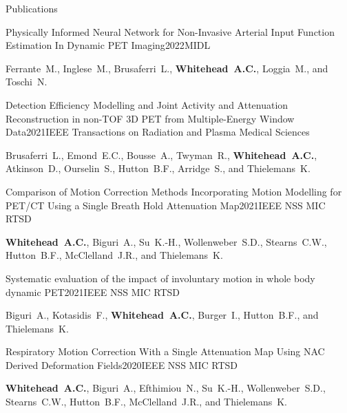 \documentclass{cv}
\begin{document}
\begin{rSection}{Publications}
        \item \begin{rSubsection}{Physically Informed Neural Network for Non-Invasive Arterial Input Function Estimation In Dynamic PET Imaging}{2022}{MIDL}{}
            \item Ferrante~M., Inglese~M., Brusaferri~L., \textbf{Whitehead~A.C.}, Loggia~M., and Toschi~N.
        \end{rSubsection}
        
        \item \begin{rSubsection}{Detection Efficiency Modelling and Joint Activity and Attenuation Reconstruction in non-TOF 3D PET from Multiple-Energy Window Data}{2021}{IEEE Transactions on Radiation and Plasma Medical Sciences}{}
            \item Brusaferri~L., Emond~E.C., Bousse~A., Twyman~R., \textbf{Whitehead~A.C.}, Atkinson~D., Ourselin~S., Hutton~B.F., Arridge~S., and Thielemans~K.
        \end{rSubsection}
        
        \item \begin{rSubsection}{Comparison of Motion Correction Methods Incorporating Motion Modelling for PET/CT Using a Single Breath Hold Attenuation Map}{2021}{IEEE NSS MIC RTSD}{}
            \item \textbf{Whitehead~A.C.}, Biguri~A., Su~K.-H., Wollenweber~S.D., Stearns~C.W., Hutton~B.F., McClelland~J.R., and Thielemans~K.
        \end{rSubsection}
        
        \item \begin{rSubsection}{Systematic evaluation of the impact of involuntary motion in whole body dynamic PET}{2021}{IEEE NSS MIC RTSD}{}
            \item Biguri~A., Kotasidis~F., \textbf{Whitehead~A.C.}, Burger~I., Hutton~B.F., and Thielemans~K.
        \end{rSubsection}
        
        \item \begin{rSubsection}{Respiratory Motion Correction With a Single Attenuation Map Using NAC Derived Deformation Fields}{2020}{IEEE NSS MIC RTSD}{}
            \item \textbf{Whitehead~A.C.}, Biguri~A., Efthimiou~N., Su~K.-H., Wollenweber~S.D., Stearns~C.W., Hutton~B.F., McClelland~J.R., and Thielemans~K.
        \end{rSubsection}
        

\end{rSection}
\end{document}
